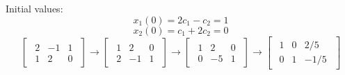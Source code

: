{    Initial values: \\
    \[
        x_1(0) = 2c_1 - c_2 = 1
    \]
    \[
        x_2(0) = c_1 + 2c_2 = 0
    \]
    \[
        \begin{bmatrix}
            \begin{array}{cc|c}
                2 & -1 & 1 \\
                1 & 2 & 0
            \end{array}
        \end{bmatrix}
        \to
        \begin{bmatrix}
            \begin{array}{cc|c}
                1 & 2 & 0 \\
                2 & -1 & 1
            \end{array}
        \end{bmatrix}
        \to
        \begin{bmatrix}
            \begin{array}{cc|c}
                1 & 2 & 0 \\
                0 & -5 & 1
            \end{array}
        \end{bmatrix}
        \to
        \begin{bmatrix}
            \begin{array}{cc|c}
                1 & 0 & 2/5 \\
                0 & 1 & -1/5
            \end{array}
        \end{bmatrix}
    \]

}


